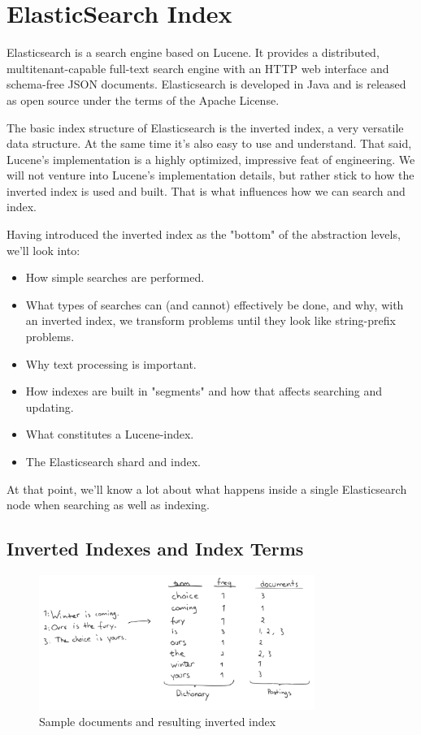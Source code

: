 \section{ElasticSearch Index}

Elasticsearch is a search engine based on Lucene. It provides a distributed, multitenant-capable full-text search engine with an HTTP web interface and schema-free JSON documents. Elasticsearch is developed in Java and is released as open source under the terms of the Apache License.\cite{wiki_elastic}

The basic index structure of Elasticsearch is the inverted index, a very versatile data structure. At the same time it's also easy to use and understand. That said, Lucene's implementation is a highly optimized, impressive feat of engineering. We will not venture into Lucene's implementation details, but rather stick to how the inverted index is used and built. That is what influences how we can search and index.\cite{art_elastic}

Having introduced the inverted index as the "bottom" of the abstraction levels, we'll look into:
\begin{itemize}
\item How simple searches are performed.
\item What types of searches can (and cannot) effectively be done, and why, with an inverted index, we transform problems until they look like string-prefix problems.
\item Why text processing is important.
\item How indexes are built in "segments" and how that affects searching and updating.
\item What constitutes a Lucene-index.
\item The Elasticsearch shard and index.
\end{itemize}

At that point, we'll know a lot about what happens inside a single Elasticsearch node when searching as well as indexing.

\subsection*{Inverted Indexes and Index Terms}

\begin{figure}
\centering
\includegraphics[width=0.8\textwidth]{img/elastic.png}
\caption{Sample documents and resulting inverted index}
\label{}
\end{figure}


